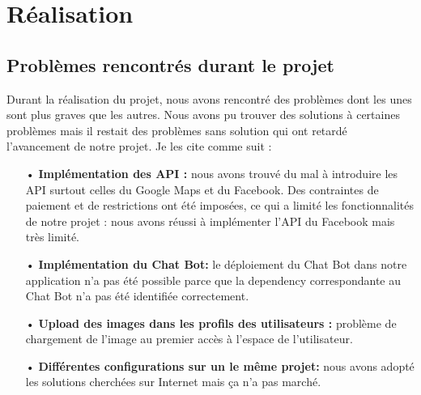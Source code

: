 \documentclass[a4paper]{report}
\begin{document}
\tableofcontents
\thispagestyle{empty}
\setcounter{page}{0}

\newpage








\chapter{Réalisation}

\section{Problèmes rencontrés durant le projet}
\begin{spacing}{2}
\par 
Durant la réalisation du projet, nous avons rencontré des problèmes dont les unes sont plus graves que les autres. Nous avons pu trouver des solutions à certaines problèmes mais il restait des problèmes sans solution qui ont retardé l'avancement de notre projet. Je les cite comme suit :
\begin{itemize}
\item[•] \textbf{Implémentation des API :} nous avons trouvé du mal à introduire les API surtout celles du Google Maps et du Facebook. Des contraintes de paiement et de restrictions ont été imposées, ce qui a limité les fonctionnalités de notre projet : nous avons réussi à implémenter l'API du Facebook mais très limité. 
\item[•] \textbf{Implémentation du Chat Bot:} le déploiement du Chat Bot dans notre application n'a pas été possible parce que la dependency correspondante au Chat Bot n'a pas été identifiée correctement.
\item[•] \textbf{Upload des images dans les profils des utilisateurs :} problème de chargement de l'image au premier accès à l'espace de l'utilisateur.
\item[•] \textbf{Différentes configurations sur un le même projet:} nous avons adopté les solutions cherchées sur Internet mais ça n'a pas marché. 
\end{itemize} 


\end{spacing}
\end{document}
